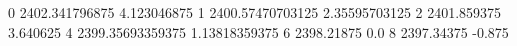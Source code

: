0 2402.341796875 4.123046875
1 2400.57470703125 2.35595703125
2 2401.859375 3.640625
4 2399.35693359375 1.13818359375
6 2398.21875 0.0
8 2397.34375 -0.875
